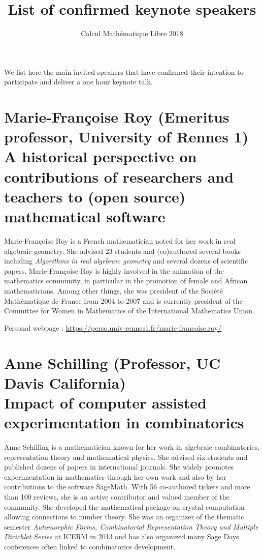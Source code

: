 \documentclass{paper}
\title{List of confirmed keynote speakers}
\subtitle{Calcul Mathématique Libre 2018}
\date{}
\newcommand{\orateur}[3]{%
  \section*{%
    #1 {\small(#2)}\nopagebreak\\
    #3}
}
\begin{document}
\maketitle
\thispagestyle{empty}

We list here the main invited speakers that have confirmed their
intention to participate and deliver a one hour keynote talk.



\orateur
{Marie-Françoise Roy}
{Emeritus professor, University of Rennes 1}
{A historical perspective on contributions of researchers and teachers
  to (open source) mathematical software}

Marie-Françoise Roy is a French mathematician noted for her work in
real algebraic geometry. She advised 23 students and (co)authored
several books including \textit{Algorithms in real algebraic geometry} and
several dozens of scientific papers. Marie-Françoise Roy is highly
involved in the animation of the mathematics community, in particular
in the promotion of female and African mathematicians. Among other
things, she was president of the Société Mathématique de France from
2004 to 2007 and is currently president of the Committee for Women in
Mathematics of the International Mathematics Union.

\medskip

Personal webpage : \url{https://perso.univ-rennes1.fr/marie-francoise.roy/}

\orateur
{Anne Schilling}
{Professor, UC Davis California}
{Impact of computer assisted experimentation in combinatorics}

Anne Schilling is a mathematician known for her work in algebraic combinatorics, 
representation theory and mathematical physics. She advised six students and published
dozens of papers in international journals. She widely promotes experimentation 
in mathematics through her own work and also by her contributions to
the software SageMath. With 56 co-authored tickets and more than 100 reviews, she
is an active contributor and valued member of the community. She developed 
the mathematical package on crystal computation allowing connections to number
theory. She was an organizer of the thematic semester \textit{Automorphic Forms, 
Combinatorial Representation Theory and Multiple Dirichlet Series} at ICERM
in 2013 and has also organized many Sage Days conferences often linked to 
combinatorics development.
\end{document}
